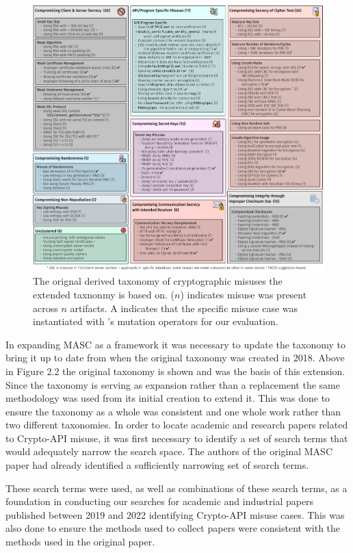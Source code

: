\begin{figure}[!ht]
	\centering
    \includegraphics[width=0.96\linewidth]{figures/taxonomy.pdf}
	\vspace{-1.em}
    \caption{\small The orignal derived taxonomy of cryptographic misuses the extended taxnonmy is based on. ($n$) indicates misuse was present across $n$ artifacts.  A \checkmark indicates that the specific misuse case was instantiated with \tool's mutation operators for our evaluation.}
    \label{fig:taxonomy}
	
\end{figure}


In expanding MASC as a framework it was necessary to update the taxonomy to bring it up to date from when the original taxonomy was created in 2018. Above in Figure 2.2 the original taxonomy is shown and was the basis of this extension. Since the taxonomy is serving as expansion rather than a replacement the same methodology was used from its initial creation to extend it. This was done to ensure the taxonomy as a whole was consistent and one whole work rather than two different taxonomies. In order to locate academic and research papers related to Crypto-API misuse, it was first necessary to identify a set of search terms that would adequately narrow the search space. The authors of the original MASC paper had already identified a sufficiently narrowing set of search terms. 

These search terms were used, as well as combinations of these search terms, as a foundation in conducting our searches for academic and industrial papers published between 2019 and 2022 identifying Crypto-API misuse cases. This was also done to ensure the methods used to collect papers were consistent with the methods used in the original paper.  


